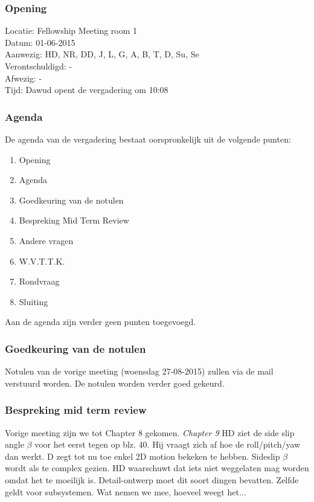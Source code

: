 \subsubsection{Opening}
Locatie: Fellowship Meeting room 1\\
Datum: 01-06-2015\\
Aanwezig: HD, NR, DD, J, L, G, A, B, T, D, Su, Se\\
Verontschuldigd: - \\
Afwezig: - \\
Tijd: Dawud opent de vergadering om 10:08\\

\subsubsection{Agenda}
De agenda van de vergadering bestaat oorspronkelijk uit de volgende punten:
\begin{enumerate}
\item Opening
\item Agenda
\item Goedkeuring van de notulen
\item Bespreking Mid Term Review
\item Andere vragen
\item W.V.T.T.K.
\item Rondvraag
\item Sluiting
\end{enumerate}

Aan de agenda zijn verder geen punten toegevoegd.

\subsubsection{Goedkeuring van de notulen}
Notulen van de vorige meeting (woensdag 27-08-2015) zullen via de mail verstuurd worden.
De notulen worden verder goed gekeurd.


\subsubsection{Bespreking mid term review}
Vorige meeting zijn we tot Chapter 8 gekomen.
\newline\newline
\textit{Chapter 9}\newline
HD ziet de side slip angle $\beta$ voor het eerst tegen op blz. 40. Hij vraagt zich af hoe de roll/pitch/yaw dan werkt. D zegt tot nu toe enkel 2D motion bekeken te hebben. Sideslip $\beta$ wordt als te complex gezien. HD waarschuwt dat iets niet weggelaten mag worden omdat het te moeilijk is. Detail-ontwerp moet dit soort dingen bevatten. Zelfde geldt voor subsystemen. Wat nemen we mee, hoeveel weegt het...

